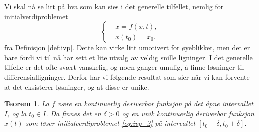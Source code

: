 \documentclass{article}
\theoremstyle{plain}
\newtheorem{thm}{Teorem}\surroundwithmdframed{thm}
\theoremstyle{definition}
\theoremstyle{remark}
\newcommand{\fcn}{x}
\begin{document}
Vi skal nå se litt på hva som kan sies i det generelle tilfellet, nemlig for initialverdiproblemet
\begin{equation} \label{eq:ivp_2}
    \left\{
    \begin{aligned}
         & \dot{\fcn} = f(\fcn, t), \\
         & \fcn(t_0) = \fcn_0.
    \end{aligned}
    \right.
\end{equation}
fra Definisjon \ref{def:ivp}. Dette kan virke litt umotivert for øyeblikket, men det er bare fordi vi til nå har sett et lite utvalg av veldig snille ligninger. I det generelle tilfelle er det ofte svært vanskelig, og noen ganger umulig, å finne løsninger til differensialligninger. Derfor har vi følgende resultat som sier når vi kan forvente at det eksisterer løsninger, og at disse er unike.

\begin{thm} \label{thm:eksistens_unikhet}
    La $f$ være en kontinuerlig deriverbar funksjon på det åpne intervallet $I$, og la $t_0 \in I$. Da finnes det en $\delta > 0$ og en unik kontinuerlig deriverbar funksjon $x(t)$ som løser initialverdiproblemet \eqref{eq:ivp_2} på intervallet $[t_0 - \delta, t_0 + \delta]$.
\end{thm}
\end{document}
